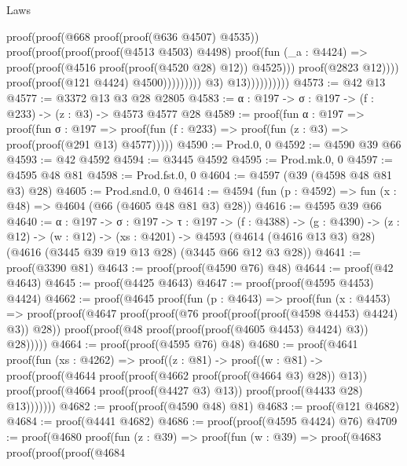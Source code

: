 \begin{lexlean}{Laws}
\begin{coremodule}
                                                  proof(proof(@668 proof(proof(@636 @4507) @4535))
                                                      proof(proof(proof(proof(@4513 @4503) @4498)
                                                            proof(fun (_a : @4424) =>
                                                              proof(proof(@4516
                                                                    proof(proof(@4520 @28) @12))
                                                                  @4525)))
                                                          proof(@2823 @12))))
                                                proof(proof(@121 @4424) @4500)))))))))
                          @3)
                        @13))))))))))
@4573 := @42 @13
@4577 := @3372 @13 @3 @28 @2805
@4583 := {α : @197} -> {σ : @197} -> (f : @233) -> (z : @3) -> @4573 @4577 @28
@4589 := proof(fun {α : @197} =>
    proof(fun {σ : @197} =>
      proof(fun (f : @233) => proof(fun (z : @3) => proof(proof(@291 @13) @4577)))))
@4590 := Prod.{0, 0}
@4592 := @4590 @39 @66
@4593 := @42 @4592
@4594 := @3445 @4592
@4595 := Prod.mk.{0, 0}
@4597 := @4595 @48 @81
@4598 := Prod.fst.{0, 0}
@4604 := @4597 (@39 (@4598 @48 @81 @3) @28)
@4605 := Prod.snd.{0, 0}
@4614 := @4594 (fun (p : @4592) => fun (x : @48) => @4604 (@66 (@4605 @48 @81 @3) @28))
@4616 := @4595 @39 @66
@4640 := {α : @197} ->
  {σ : @197} ->
  {τ : @197} ->
  (f : @4388) ->
  (g : @4390) ->
  (z : @12) ->
  (w : @12) ->
  (xs : @4201) ->
  @4593 (@4614 (@4616 @13 @3) @28) (@4616 (@3445 @39 @19 @13 @28) (@3445 @66 @12 @3 @28))
@4641 := proof(@3390 @81)
@4643 := proof(proof(@4590 @76) @48)
@4644 := proof(@42 @4643)
@4645 := proof(@4425 @4643)
@4647 := proof(proof(@4595 @4453) @4424)
@4662 := proof(@4645
      proof(fun (p : @4643) =>
        proof(fun (x : @4453) =>
          proof(proof(@4647 proof(proof(@76 proof(proof(proof(@4598 @4453) @4424) @3)) @28))
              proof(proof(@48 proof(proof(proof(@4605 @4453) @4424) @3)) @28)))))
@4664 := proof(proof(@4595 @76) @48)
@4680 := proof(@4641
      proof(fun (xs : @4262) =>
        proof((z : @81) ->
          proof((w : @81) ->
            proof(proof(@4644 proof(proof(@4662 proof(proof(@4664 @3) @28)) @13))
                proof(proof(@4664 proof(proof(@4427 @3) @13)) proof(proof(@4433 @28) @13)))))))
@4682 := proof(proof(@4590 @48) @81)
@4683 := proof(@121 @4682)
@4684 := proof(@4441 @4682)
@4686 := proof(proof(@4595 @4424) @76)
@4709 := proof(@4680
      proof(fun (z : @39) =>
        proof(fun (w : @39) =>
          proof(@4683
              proof(proof(proof(@4684

\end{coremodule}
\end{lexlean}
